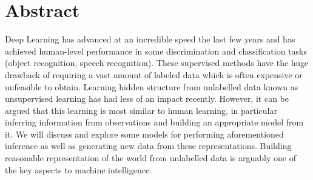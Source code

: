 \section{Abstract}
\label{sec:abstract}
Deep Learning has advanced at an incredible speed the last few years and has achieved human-level performance in some discrimination and classification tasks (object recognition, speech recognition).
These supervised methods have the huge drawback of requiring a vast amount of labeled data which is often expensive or unfeasible to obtain.
Learning hidden structure from unlabelled data known as unsupervised learning has had less of an impact recently.
However, it can be argued that this learning is most similar to human learning, in particular inferring information from observations and building an appropriate model from it.
We will discuss and explore some models for performing aforementioned inference as well as generating new data from these representations.
Building reasonable representation of the world from unlabelled data is arguably one of the key aspects to machine intelligence.





